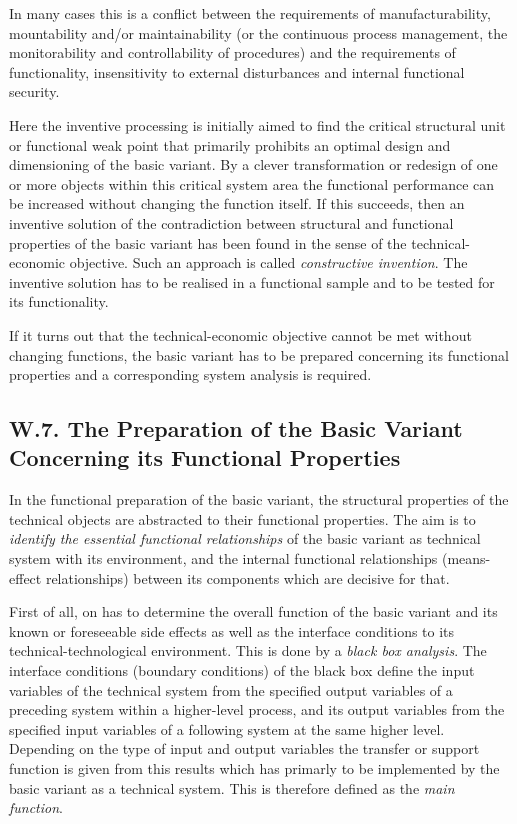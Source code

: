 \documentclass[11pt,a4paper]{article}
\begin{document}
In many cases this is a conflict between the requirements of
manufacturability, mountability and/or maintainability (or the continuous
process management, the monitorability and controllability of procedures) and
the requirements of functionality, insensitivity to external disturbances and
internal functional security.

Here the inventive processing is initially aimed to find the critical
structural unit or functional weak point that primarily prohibits an optimal
design and dimensioning of the basic variant. By a clever transformation or
redesign of one or more objects within this critical system area the
functional performance can be increased without changing the function itself.
If this succeeds, then an inventive solution of the contradiction between
structural and functional properties of the basic variant has been found in
the sense of the technical-economic objective.  Such an approach is called
\emph{constructive invention}. The inventive solution has to be realised in a
functional sample and to be tested for its functionality.

If it turns out that the technical-economic objective cannot be met without
changing functions, the basic variant has to be prepared concerning its
functional properties and a corresponding system analysis is required.

\subsection*{W.7. The Preparation of the Basic Variant Concerning its
  Functional Properties}

In the functional preparation of the basic variant, the structural properties
of the technical objects are abstracted to their functional properties. The
aim is to \emph{identify the essential functional relationships} of the basic
variant as technical system with its environment, and the internal functional
relationships (means-effect relationships) between its components which are
decisive for that.

First of all, on has to determine the overall function of the basic variant
and its known or foreseeable side effects as well as the interface conditions
to its technical-technological environment. This is done by a \emph{black box
  analysis}.  The interface conditions (boundary conditions) of the black box
define the input variables of the technical system from the specified output
variables of a preceding system within a higher-level process, and its output
variables from the specified input variables of a following system at the same
higher level. Depending on the type of input and output variables the transfer
or support function is given from this results which has primarly to be
implemented by the basic variant as a technical system. This is therefore
defined as the \emph{main function}.
\end{document}
